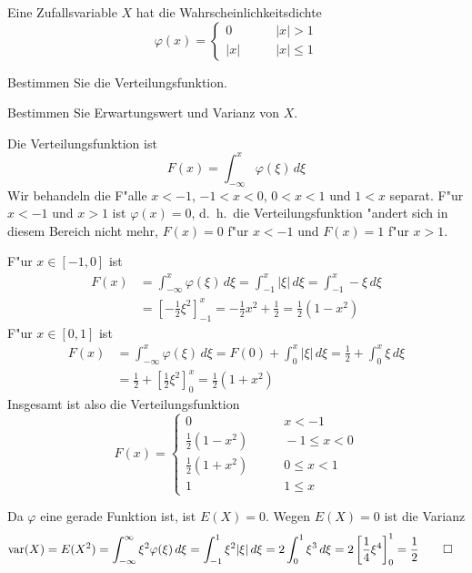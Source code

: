 Eine Zufallsvariable $X$ hat die Wahrscheinlichkeitsdichte
\[
\varphi(x)=\begin{cases}
0&\qquad |x|>1\\
|x|&\qquad |x|\le 1
\end{cases}
\]
\begin{teilaufgaben}
\item Bestimmen Sie die Verteilungsfunktion.
\item Bestimmen Sie Erwartungswert und Varianz von $X$.
\end{teilaufgaben}

\begin{loesung}
\begin{teilaufgaben}
\item Die Verteilungsfunktion ist
\[
F(x)=\int_{-\infty}^x\varphi(\xi)\,d\xi
\]
Wir behandeln die F"alle $x<-1$, $-1<x<0$, $0<x<1$ und $1<x$
separat. F"ur $x<-1$ und $x>1$ ist $\varphi(x)=0$, d.~h.~die
Verteilungsfunktion "andert sich in diesem Bereich nicht mehr,
$F(x)=0$ f"ur $x<-1$ und $F(x)=1$ f"ur $x>1$.

F"ur $x\in[-1,0]$ ist
\begin{align*}
F(x)&=\int_{-\infty}^x\varphi(\xi) \,d\xi
=
\int_{-1}^x|\xi|\,d\xi
=
\int_{-1}^x-\xi\,d\xi
\\
&=\left[-\frac12\xi^2\right]_{-1}^x
=-\frac12x^2+\frac12=\frac12(1-x^2)
\end{align*}
F"ur $x\in[0,1]$ ist
\begin{align*}
F(x)
&=
\int_{-\infty}^x \varphi(\xi)\,d\xi
=
F(0)+\int_0^x|\xi|\,d\xi
=
\frac12+\int_0^x\xi\,d\xi
\\
&=
\frac12+\left[
\frac12\xi^2
\right]_0^x
=\frac12(1+x^2)
\end{align*}
Insgesamt ist also die Verteilungsfunktion
\[
F(x)
=
\begin{cases}
0&\qquad x<-1\\
\frac12(1-x^2)&\qquad -1\le x < 0\\
\frac12(1+x^2)&\qquad 0\le x <1\\
1&\qquad 1 \le x
\end{cases}
\]
\item
Da $\varphi$ eine gerade Funktion ist, ist $E(X)=0$.
Wegen $E(X)=0$ ist die Varianz
\begin{align*}
\operatorname{var}(X)&=E(X^2)
=
\int_{-\infty}^\infty \xi^2\varphi(\xi)\,d\xi
=
\int_{-1}^1\xi^2|\xi|\,d\xi
=2\int_0^1\xi^3\,d\xi=2\left[\frac14\xi^4\right]_0^1=\frac12
\qedhere
\end{align*}
\end{teilaufgaben}
\end{loesung}

